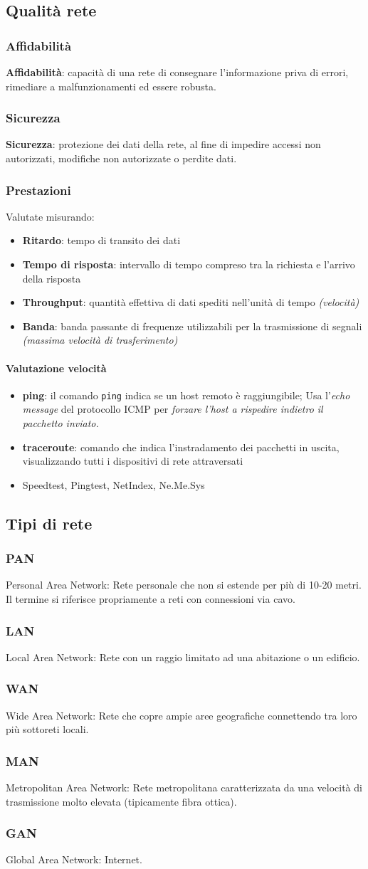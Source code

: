 \documentclass[a4paper,11pt]{article}
\def\code#1{\texttt{#1}}
\def\subsub#1{\subsubsection{#1}\label{#1}}
\begin{document}
\subsection{Qualità rete}
\subsubsection{Affidabilità}
\textbf{Affidabilità}: capacità di una rete di consegnare l'informazione priva di errori, rimediare a malfunzionamenti ed essere robusta.
\subsubsection{Sicurezza}
\textbf{Sicurezza}: protezione dei dati della rete, al fine di impedire accessi non autorizzati, modifiche non autorizzate o perdite dati.
\subsubsection{Prestazioni}
Valutate misurando:
\begin{itemize}
\item \textbf{Ritardo}: tempo di transito dei dati
\item\textbf{Tempo di risposta}: intervallo di tempo compreso tra la richiesta e l'arrivo della risposta
\item\textbf{Throughput}: quantità effettiva di dati spediti nell'unità di tempo \textit{(velocità)}
\item\textbf{Banda}: banda passante di frequenze utilizzabili per la trasmissione di segnali \textit{(massima velocità di trasferimento)}
\end{itemize}
\paragraph{Valutazione velocità} 
\begin{itemize}
\item\textbf{ping}: il comando \code{ping} indica se un host remoto è raggiungibile; Usa l'\textit{echo message} del protocollo ICMP per \textit{forzare l'host a rispedire indietro il pacchetto inviato.}
\item\textbf{traceroute}: comando che indica l'instradamento dei pacchetti in uscita, visualizzando tutti i dispositivi di rete attraversati
\item Speedtest, Pingtest, NetIndex, Ne.Me.Sys
\end{itemize}
\subsection{Tipi di rete}
\subsub{PAN} Personal Area Network: Rete personale che non si estende per più di 10-20 metri. Il termine si riferisce propriamente a reti con connessioni via cavo.
\subsub{LAN} Local Area Network: Rete con un raggio limitato ad una abitazione o un edificio.
\subsub{WAN} Wide Area Network: Rete che copre ampie aree geografiche connettendo tra loro più sottoreti locali. 
\subsub{MAN} Metropolitan Area Network: Rete metropolitana caratterizzata da una velocità di trasmissione molto elevata (tipicamente fibra ottica).
\subsub{GAN} Global Area Network: Internet.
\end{document}
